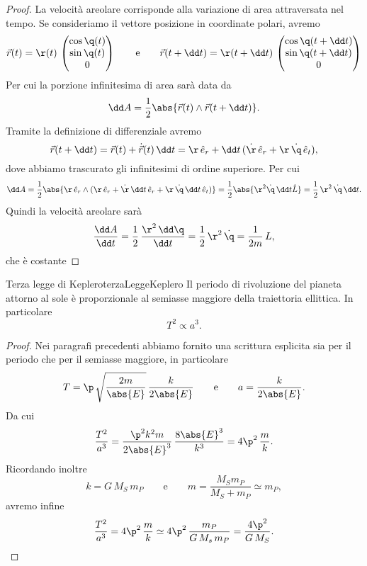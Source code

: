 \begin{proof}
	La velocità areolare corrisponde  alla variazione di area attraversata nel tempo. Se consideriamo il vettore posizione in coordinate polari, avremo
	\[
		\vec{r}(t) = \r(t)\, 	\begin{pmatrix}
			\cos\q(t) \\
			\sin\q(t) \\
			0	
		\end{pmatrix} \qquad\text{e}\qquad
		\vec{r}(t+\dd t) = \r(t+\dd t)\, 	\begin{pmatrix}
			\cos\q(t+\dd t) \\
			\sin\q(t+\dd t) \\
			0	
		\end{pmatrix}
	\]
	Per cui la porzione infinitesima di area sarà data da
	\[
		\dd A = \frac{1}{2} \abs{\vec{r}(t) \wedge \vec{r}(t+\dd t)}.
	\]
	Tramite la definizione di differenziale avremo
	\[
		\vec{r}(t+\dd t) = \vec{r}(t) +\dot{\vec{r}}(t)\,\dd t = \r\,\hat{e}_r + \dd t\,(\dot{\r}\,\hat{e}_r + \r\,\dot{\q}\,\hat{e}_t),
	\]
	dove abbiamo trascurato gli infinitesimi di ordine superiore. Per cui
	\[
		\dd A = \frac{1}{2} \abs{\r\,\hat{e}_r \wedge (\r\,\hat{e}_r + \dot{\r}\,\dd t\,\hat{e}_r + \r\,\dot{\q}\,\dd t\,\hat{e}_t)} = \frac{1}{2}\abs{\r^2\dot{\q}\,\dd t \hat{L}} = \frac{1}{2}\,\r^2\,\dot{\q}\,\dd t.
	\]
	Quindi la velocità areolare sarà
	\[
		\frac{\dd A}{\dd t} = \frac{1}{2}\,\frac{\r^2\,\dd \q}{\dd t} = \frac{1}{2}\,\r^2\,\dot{\q} = \frac{1}{2m}\,L,
	\]
	che è costante
\end{proof}

\begin{teor}{Terza legge di Keplero}{terzaLeggeKeplero}
	Il periodo di rivoluzione del pianeta attorno al sole è proporzionale al semiasse maggiore della traiettoria ellittica. In particolare
	\[
		T^2 \propto a^3.
	\]
\end{teor}

\begin{proof}
	Nei paragrafi precedenti abbiamo fornito una scrittura esplicita sia per il periodo che per il semiasse maggiore, in particolare
	\[
		T = \p\,\sqrt{\frac{2m}{\abs{E}}}\,\frac{k}{2\abs{E}} \qquad\text{e}\qquad a = \frac{k}{2\abs{E}}.
	\]
	Da cui
	\[
		\frac{T^2}{a^3} = \frac{\p^2 k^2 m}{2\abs{E}^3}\,\frac{8\abs{E}^3}{k^3} = 4\p^2\,\frac{m}{k}.
	\]
	Ricordando inoltre
	\[
		k = G\,M_S\,m_P \qquad\text{e}\qquad m = \frac{M_S m_P}{M_S+m_P} \simeq m_P,
	\]
	avremo infine
	\[
		\frac{T^2}{a^3} = 4\p^2\,\frac{m}{k} \simeq 4\p^2\,\frac{m_P}{G\,M_s\,m_P} = \frac{4\p^2}{G\,M_S}.\qedhere
	\]
\end{proof}